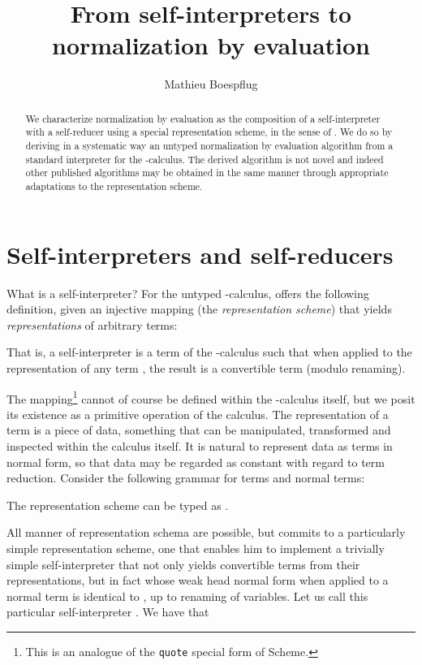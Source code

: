 \documentclass[a4paper]{amsart}
\author{Mathieu Boespflug}
\title{From self-interpreters to normalization by evaluation}
\begin{document}
\maketitle

\begin{abstract}
  We characterize normalization by evaluation as the composition of a
  self-interpreter with a self-reducer using a special representation scheme,
  in the sense of \citet{mogensen:selfint}. We do so by deriving in a
  systematic way an untyped normalization by evaluation algorithm from a
  standard interpreter for the -calculus. The derived algorithm is
  not novel and indeed other published algorithms may be obtained in the same
  manner through appropriate adaptations to the representation scheme.
\end{abstract}

\section{Self-interpreters and self-reducers}
What is a self-interpreter? For the untyped -calculus,
\citet{mogensen:selfint} offers the following definition, given an injective
mapping  (the {\em representation scheme}) that yields {\em
  representations} of arbitrary terms:

That is, a self-interpreter is a term  of the -calculus such that
when applied to the representation  of any term , the result is a
convertible term (modulo renaming).



The  mapping\footnote{This is an analogue of the \texttt{quote}
  special form of Scheme.} cannot of course be defined within the
-calculus itself, but we posit its existence as a primitive operation
of the calculus. The representation of a term is a piece of data, something
that can be manipulated, transformed and inspected within the calculus itself.
It is natural to represent data as terms in normal form, so that data may be
regarded as constant with regard to term reduction. Consider the following
grammar for terms and normal terms:

The representation scheme can be typed as .

All manner of representation schema are possible, but
\citeauthor{mogensen:selfint} commits to a particularly simple representation
scheme, one that enables him to implement a trivially simple self-interpreter
that not only yields convertible terms from their representations, but in fact
whose weak head normal form when applied to a normal term  is identical to
, up to renaming of variables. Let us call this particular self-interpreter
. We have that
\end{document}
